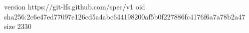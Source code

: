 version https://git-lfs.github.com/spec/v1
oid sha256:2c6e47ed77097e126cd5a4abc644198200af5b0f227886fc4176f6a7a78b2a47
size 2330
